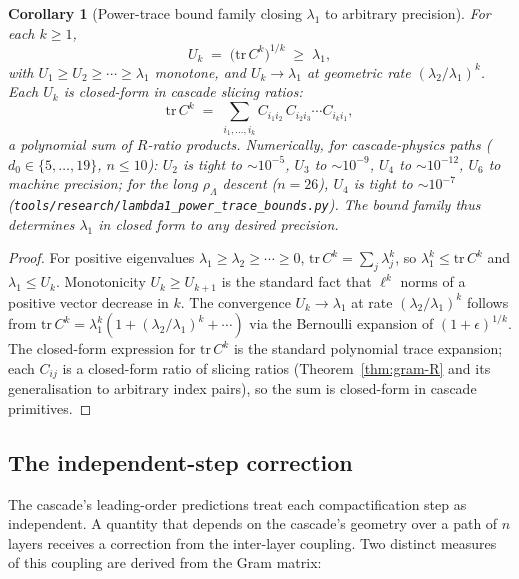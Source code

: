 \documentclass[11pt,a4paper]{article}
\newtheorem{corollary}[theorem]{Corollary}
\begin{document}
\begin{corollary}[Power-trace bound family closing $\lambda_1$ to arbitrary precision]\label{cor:lambda1-power-trace}
For each $k \geq 1$,
\[
U_k \;=\; \bigl(\mathrm{tr}\,C^k\bigr)^{1/k} \;\geq\; \lambda_1,
\]
with $U_1 \geq U_2 \geq \cdots \geq \lambda_1$ monotone, and $U_k \to \lambda_1$ at geometric rate $(\lambda_2/\lambda_1)^k$. Each $U_k$ is closed-form in cascade slicing ratios:
\[
\mathrm{tr}\,C^k \;=\; \sum_{i_1, \ldots, i_k} C_{i_1 i_2}\,C_{i_2 i_3} \cdots C_{i_k i_1},
\]
a polynomial sum of $R$-ratio products. Numerically, for cascade-physics paths ($d_0 \in \{5, \ldots, 19\}$, $n \leq 10$): $U_2$ is tight to $\sim 10^{-5}$, $U_3$ to $\sim 10^{-9}$, $U_4$ to $\sim 10^{-12}$, $U_6$ to machine precision; for the long $\rho_\Lambda$ descent ($n = 26$), $U_4$ is tight to $\sim 10^{-7}$ (\texttt{tools/research/lambda1\_power\_trace\_bounds.py}). The bound family thus determines $\lambda_1$ in closed form to any desired precision.
\end{corollary}

\begin{proof}
For positive eigenvalues $\lambda_1 \geq \lambda_2 \geq \cdots \geq 0$, $\mathrm{tr}\,C^k = \sum_j \lambda_j^k$, so $\lambda_1^k \leq \mathrm{tr}\,C^k$ and $\lambda_1 \leq U_k$. Monotonicity $U_k \geq U_{k+1}$ is the standard fact that $\ell^k$ norms of a positive vector decrease in $k$. The convergence $U_k \to \lambda_1$ at rate $(\lambda_2/\lambda_1)^k$ follows from $\mathrm{tr}\,C^k = \lambda_1^k(1 + (\lambda_2/\lambda_1)^k + \cdots)$ via the Bernoulli expansion of $(1 + \epsilon)^{1/k}$. The closed-form expression for $\mathrm{tr}\,C^k$ is the standard polynomial trace expansion; each $C_{ij}$ is a closed-form ratio of slicing ratios (Theorem~\ref{thm:gram-R} and its generalisation to arbitrary index pairs), so the sum is closed-form in cascade primitives.
\end{proof}

\subsection{The independent-step correction}\label{sec:first-order}

The cascade's leading-order predictions treat each compactification step as independent. A quantity that depends on the cascade's geometry over a path of $n$ layers receives a correction from the inter-layer coupling. Two distinct measures of this coupling are derived from the Gram matrix:
\end{document}
